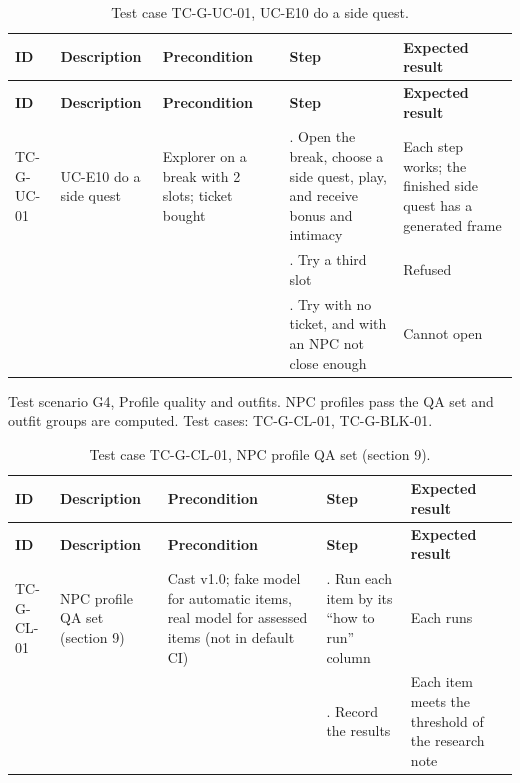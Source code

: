 {\small
\begin{longtable}{|>{\raggedright\arraybackslash}p{}|>{\raggedright\arraybackslash}p{}|>{\raggedright\arraybackslash}p{}|>{\raggedright\arraybackslash}p{}|>{\raggedright\arraybackslash}p{}|}
\caption{Test case TC-G-UC-01, UC-E10 do a side quest.} \\
\hline
\textbf{ID} & \textbf{Description} & \textbf{Precondition} & \textbf{Step} & \textbf{Expected result} \\ \hline
\endfirsthead
\hline
\textbf{ID} & \textbf{Description} & \textbf{Precondition} & \textbf{Step} & \textbf{Expected result} \\ \hline
\endhead
TC-G-UC-01 & UC-E10 do a side quest & Explorer on a break with 2 slots; ticket bought & 1. Open the break, choose a side quest, play, and receive bonus and intimacy & Each step works; the finished side quest has a generated frame \\ \hline
 &  &  & 2. Try a third slot & Refused \\ \hline
 &  &  & 3. Try with no ticket, and with an NPC not close enough & Cannot open \\ \hline
\end{longtable}
}

Test scenario G4, Profile quality and outfits. NPC profiles pass the QA set and outfit groups are computed. Test cases: TC-G-CL-01, TC-G-BLK-01.

{\small
\begin{longtable}{|>{\raggedright\arraybackslash}p{}|>{\raggedright\arraybackslash}p{}|>{\raggedright\arraybackslash}p{}|>{\raggedright\arraybackslash}p{}|>{\raggedright\arraybackslash}p{}|}
\caption{Test case TC-G-CL-01, NPC profile QA set (section 9).} \\
\hline
\textbf{ID} & \textbf{Description} & \textbf{Precondition} & \textbf{Step} & \textbf{Expected result} \\ \hline
\endfirsthead
\hline
\textbf{ID} & \textbf{Description} & \textbf{Precondition} & \textbf{Step} & \textbf{Expected result} \\ \hline
\endhead
TC-G-CL-01 & NPC profile QA set (section 9) & Cast v1.0; fake model for automatic items, real model for assessed items (not in default CI) & 1. Run each item by its ``how to run'' column & Each runs \\ \hline
 &  &  & 2. Record the results & Each item meets the threshold of the research note \\ \hline
\end{longtable}
}


